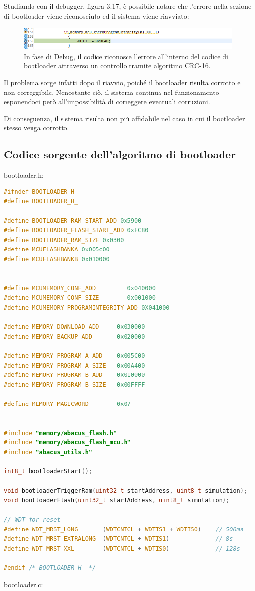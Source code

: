 \documentclass[LaM,binding=0.6cm]{../sapthesis}
\begin{document}
Studiando con il debugger, figura 3.17, è possibile notare che l’errore nella sezione di bootloader viene riconosciuto ed il sistema viene riavviato:

\begin{figure}[htbp]
\centerline{\includegraphics[scale=0.64]{examples/DebugCorruption.PNG}}
\caption{In fase di Debug, il codice riconosce l'errore all'interno del codice di bootloader attraverso un controllo tramite algoritmo CRC-16.}
\label{fig}
\end{figure}
\newline

Il problema sorge infatti dopo il riavvio, poiché il bootloader risulta corrotto e non correggibile. Nonostante ciò, il sistema continua nel funzionamento esponendoci però all’impossibilità di correggere eventuali corruzioni. 

Di conseguenza, il sistema risulta non più affidabile nel caso in cui il bootloader stesso venga corrotto.

\clearpage
\subsection{Codice sorgente dell'algoritmo di bootloader}

bootloader.h:

\begin{lstlisting}[language=c]
#ifndef BOOTLOADER_H_
#define BOOTLOADER_H_

#define BOOTLOADER_RAM_START_ADD 0x5900
#define BOOTLOADER_FLASH_START_ADD 0xFC80
#define BOOTLOADER_RAM_SIZE 0x0300
#define MCUFLASHBANKA 0x005c00
#define MCUFLASHBANKB 0x010000


#define MCUMEMORY_CONF_ADD         0x040000
#define MCUMEMORY_CONF_SIZE        0x001000
#define MCUMEMORY_PROGRAMINTEGRITY_ADD 0X041000

#define MEMORY_DOWNLOAD_ADD     0x030000
#define MEMORY_BACKUP_ADD       0x020000

#define MEMORY_PROGRAM_A_ADD    0x005C00
#define MEMORY_PROGRAM_A_SIZE   0x00A400
#define MEMORY_PROGRAM_B_ADD    0x010000
#define MEMORY_PROGRAM_B_SIZE   0x00FFFF

#define MEMORY_MAGICWORD        0x07


#include "memory/abacus_flash.h"
#include "memory/abacus_flash_mcu.h"
#include "abacus_utils.h"

int8_t bootloaderStart();

void bootloaderTriggerRam(uint32_t startAddress, uint8_t simulation);
void bootloaderFlash(uint32_t startAddress, uint8_t simulation);

// WDT for reset
#define WDT_MRST_LONG       (WDTCNTCL + WDTIS1 + WDTIS0)    // 500ms
#define WDT_MRST_EXTRALONG  (WDTCNTCL + WDTIS1)             // 8s
#define WDT_MRST_XXL        (WDTCNTCL + WDTIS0)             // 128s

#endif /* BOOTLOADER_H_ */
\end{lstlisting}
\clearpage
bootloader.c:
\end{document}
